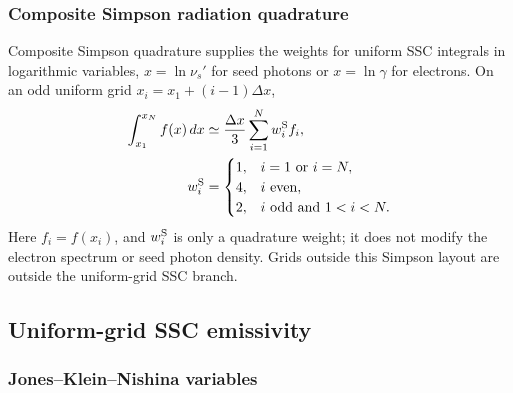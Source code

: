 \documentclass[twocolumn]{aastex702}
\begin{document}
\subsubsection{Composite Simpson radiation quadrature}

Composite Simpson quadrature supplies the weights for uniform SSC integrals in
logarithmic variables, \(x=\ln\nu_s'\) for seed photons or \(x=\ln\gamma\) for
electrons.  On an odd uniform grid \(x_i=x_1+(i-1)\Delta x\),
\begin{equation}
\begin{aligned}
\int_{x_1}^{x_N} f(x)\,dx
&\simeq
\frac{\Delta x}{3}\sum_{i=1}^{N}w_i^{\rm S} f_i,\\
w_i^{\rm S}
&=
\begin{cases}
1, & i=1 \ \text{or}\ i=N,\\
4, & i \ \text{even},\\
2, & i \ \text{odd and}\ 1<i<N .
\end{cases}
\end{aligned}
\end{equation}
Here \(f_i=f(x_i)\), and \(w_i^{\rm S}\) is only a quadrature weight; it does not
modify the electron spectrum or seed photon density.  Grids outside this Simpson
layout are outside the uniform-grid SSC branch.

\subsection{Uniform-grid SSC emissivity}

\subsubsection{Jones--Klein--Nishina variables}
\end{document}
